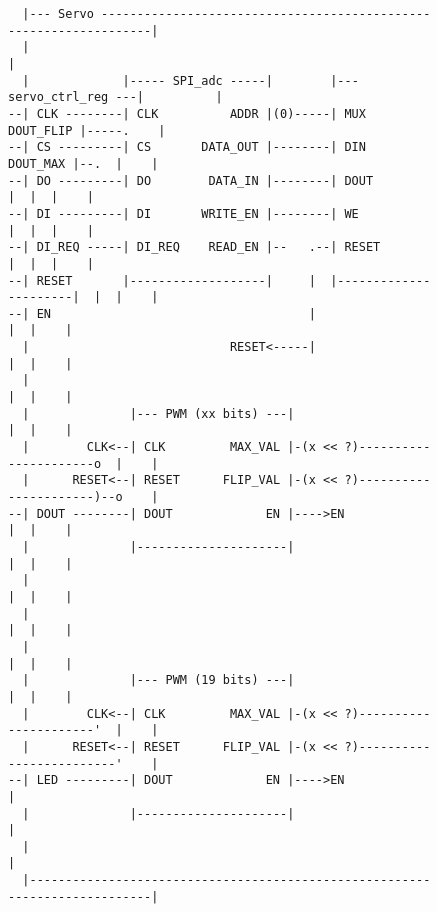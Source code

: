 \begin{figure}[h]
\centering
\begin{Verbatim}
  |--- Servo ------------------------------------------------------------------|
  |                                                                            |
  |             |----- SPI_adc -----|        |--- servo_ctrl_reg ---|          |
--| CLK --------| CLK          ADDR |(0)-----| MUX        DOUT_FLIP |-----.    |
--| CS ---------| CS       DATA_OUT |--------| DIN         DOUT_MAX |--.  |    |
--| DO ---------| DO        DATA_IN |--------| DOUT                 |  |  |    |
--| DI ---------| DI       WRITE_EN |--------| WE                   |  |  |    |
--| DI_REQ -----| DI_REQ    READ_EN |--   .--| RESET                |  |  |    |
--| RESET       |-------------------|     |  |----------------------|  |  |    |
--| EN                                    |                            |  |    |
  |                            RESET<-----|                            |  |    |
  |                                                                    |  |    |
  |              |--- PWM (xx bits) ---|                               |  |    |
  |        CLK<--| CLK         MAX_VAL |-(x << ?)----------------------o  |    |
  |      RESET<--| RESET      FLIP_VAL |-(x << ?)----------------------)--o    |
--| DOUT --------| DOUT             EN |---->EN                        |  |    |
  |              |---------------------|                               |  |    |
  |                                                                    |  |    |
  |                                                                    |  |    |
  |                                                                    |  |    |
  |              |--- PWM (19 bits) ---|                               |  |    |
  |        CLK<--| CLK         MAX_VAL |-(x << ?)----------------------'  |    |
  |      RESET<--| RESET      FLIP_VAL |-(x << ?)-------------------------'    |
--| LED ---------| DOUT             EN |---->EN                                |
  |              |---------------------|                                       |
  |                                                                            |
  |----------------------------------------------------------------------------|
\end{Verbatim}
\end{figure}



